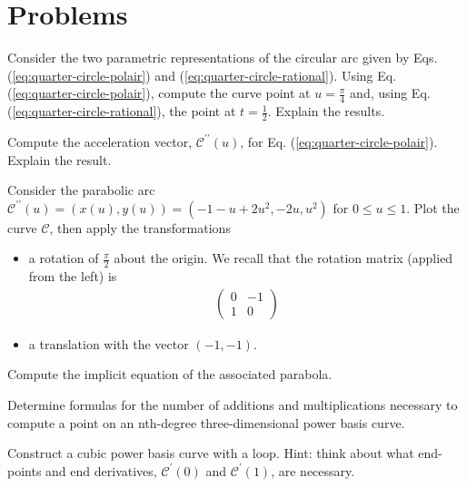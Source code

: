 \section{Problems}
\label{sec:cad-intro-problems}

\begin{exercise}
  Consider the two parametric representations of the circular arc given by Eqs. (\ref{eq:quarter-circle-polair}) and (\ref{eq:quarter-circle-rational}). Using Eq. (\ref{eq:quarter-circle-polair}), compute the curve point at $u = \frac{\pi}{4}$ and, using Eq. (\ref{eq:quarter-circle-rational}), the point at $t = \frac{1}{2}$. Explain the results.
\end{exercise}

\begin{exercise}
  Compute the acceleration vector, $\mathcal{C}^{\prime\prime}(u)$, for Eq. (\ref{eq:quarter-circle-polair}). Explain the result.
\end{exercise}

\begin{exercise}
  Consider the parabolic arc $\mathcal{C}^{\prime\prime}(u) = (x(u), y(u)) = \left( -1-u+2u^2, -2u, u^2 \right)$ for $0 \leq u \leq 1$. Plot the curve $\mathcal{C}$, then apply the transformations
  \begin{itemize}
    \item a rotation of $\frac{\pi}{2}$ about the origin. We recall that the rotation matrix (applied from the left) is 
      \begin{align*}
        \begin{pmatrix}
          0 & -1 \\
          1 &  0
        \end{pmatrix}
      \end{align*}
    \item a translation with the vector $\left( -1, -1 \right)$.
  \end{itemize}
  Compute the implicit equation of the associated parabola.
\end{exercise}

\begin{exercise}
  Determine formulas for the number of additions and multiplications necessary to compute a point on an nth-degree three-dimensional power basis curve.
\end{exercise}

\begin{exercise}
  Construct a cubic power basis curve with a loop. Hint: think about what end- points and end derivatives, $\mathcal{C}^\prime(0)$ and $\mathcal{C}^\prime(1)$, are necessary.
\end{exercise}


